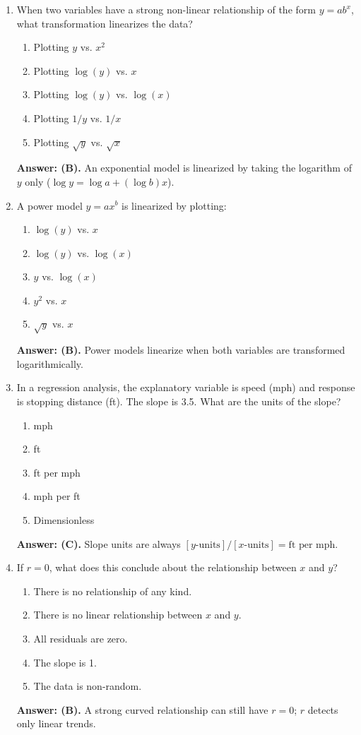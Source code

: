 \begin{enumerate}[resume, leftmargin=1.5em]
  \item When two variables have a strong non-linear relationship of the form $y = a b^x$, what transformation linearizes the data?
  \begin{enumerate}[label=(\Alph*)]
    \item Plotting $y$ vs. $x^2$ \item Plotting $\log(y)$ vs. $x$ \item Plotting $\log(y)$ vs. $\log(x)$ \item Plotting $1/y$ vs. $1/x$ \item Plotting $\sqrt{y}$ vs. $\sqrt{x}$
  \end{enumerate}
  \textbf{Answer: (B).} An exponential model is linearized by taking the logarithm of $y$ only ($\log y = \log a + (\log b)x$).

  \item A power model $y = a x^b$ is linearized by plotting:
  \begin{enumerate}[label=(\Alph*)]
    \item $\log(y)$ vs. $x$ \item $\log(y)$ vs. $\log(x)$ \item $y$ vs. $\log(x)$ \item $y^2$ vs. $x$ \item $\sqrt{y}$ vs. $x$
  \end{enumerate}
  \textbf{Answer: (B).} Power models linearize when both variables are transformed logarithmically.

  \item In a regression analysis, the explanatory variable is speed (mph) and response is stopping distance (ft). The slope is 3.5. What are the units of the slope?
  \begin{enumerate}[label=(\Alph*)]
    \item mph \item ft \item ft per mph \item mph per ft \item Dimensionless
  \end{enumerate}
  \textbf{Answer: (C).} Slope units are always $[y\text{-units}] / [x\text{-units}] = \text{ft per mph}$.

  \item If $r = 0$, what does this conclude about the relationship between $x$ and $y$?
  \begin{enumerate}[label=(\Alph*)]
    \item There is no relationship of any kind.
    \item There is no linear relationship between $x$ and $y$.
    \item All residuals are zero.
    \item The slope is 1.
    \item The data is non-random.
  \end{enumerate}
  \textbf{Answer: (B).} A strong curved relationship can still have $r = 0$; $r$ detects only linear trends.


\end{enumerate}
